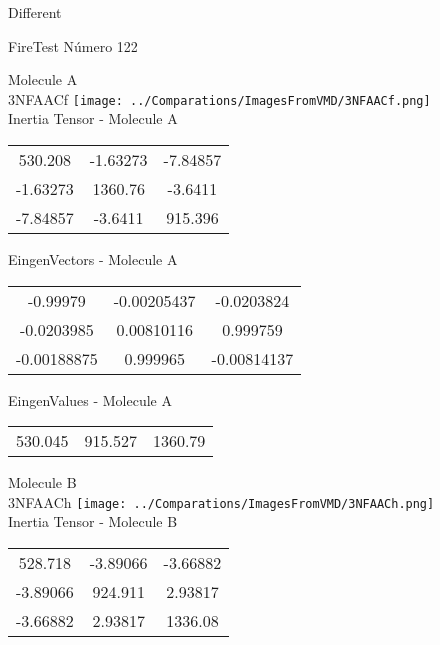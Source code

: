 \begin{center}
\vtab
\vtab
\textcolor{NavyBlue}{\Large Different}
\end{center}

 \newpage

\vtab[-2cm]
\begin{center}
{\large FireTest \tab Número 122}
\end{center}
\begin{multicols}{2}
\begin{center}

Molecule A \\ 
3NFAACf
\texttt{[image: ../Comparations/ImagesFromVMD/3NFAACf.png]}
\\
Inertia Tensor - Molecule A \\
\vtab

\begin{tabular}{|c c c|}
530.208	 & 	-1.63273	 & 	-7.84857	 \\
-1.63273	 & 	1360.76	 & 	-3.6411	 \\
-7.84857	 & 	-3.6411	 & 	915.396
\end{tabular}

\vtab
 EingenVectors - Molecule A     \\
\vtab
\begin{tabular}{|c c c|}
-0.99979	 & 	-0.00205437	 & 	-0.0203824	 \\
-0.0203985	 & 	0.00810116	 & 	0.999759	 \\
-0.00188875	 & 	0.999965	 & 	-0.00814137
\end{tabular}

\vtab
 EingenValues - Molecule A     \\
\vtab
\begin{tabular}{|c c c|}
530.045	 & 	915.527	 & 	1360.79	 \\
\end{tabular}
\columnbreak

Molecule B \\ 
3NFAACh
\texttt{[image: ../Comparations/ImagesFromVMD/3NFAACh.png]}
\\
Inertia Tensor - Molecule B \\
\vtab

\begin{tabular}{|c c c|}
528.718	 & 	-3.89066	 & 	-3.66882	 \\
-3.89066	 & 	924.911	 & 	2.93817	 \\
-3.66882	 & 	2.93817	 & 	1336.08
\end{tabular}


\end{center}
\end{multicols}
